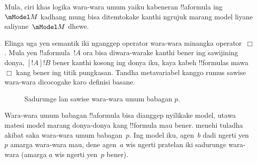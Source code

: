 \documentclass[../../../include/open-logic-section]{subfiles}
\begin{document}
\begin{defn}
\begin{enumerate}
  \end{enumerate} 
\end{defn}

Mula, ciri khas logika wara-wara umum yaiku kabeneran !!a{formula}
ing~$\mModel M$ kadhang mung bisa ditemtokake kanthi ngrujuk marang
model liyane saliyane~$\mModel M$ dhewe.

Elinga uga yen semantik iki nganggep operator wara-wara minangka
operator~$\Box$. Mula yen !!a{formula}~$!A$ ora bisa diwara-warake
kanthi bener ing sawijining donya, $[!A] !B$ bener kanthi kosong ing
donya iku, kaya kabeh !!{formula}s mawa $\Box$ kang bener ing titik pungkasan.
Tandha metavariabel kanggo rumus sawise wara-wara dicocogake karo definisi basane.

\begin{figure}
  \begin{center}
  \end{center}
  \caption{Sadurunge lan sawise wara-wara umum babagan $p$.}
\end{figure}

Wara-wara umum babagan !!a{formula} bisa dianggep nyilikake model,
utawa matesi model marang donya-donya kang !!{formula} mau bener.
 menehi tuladha akibat saka
wara-wara umum babagan~$p$. Ing model iku, agen~$b$ dadi ngerti
yen~$p$ amarga wara-wara mau, dene agen~$a$ wis ngerti pratelan iki sadurunge wara-wara
(amarga $a$ wis ngerti yen~$p$ bener).
\end{document}
